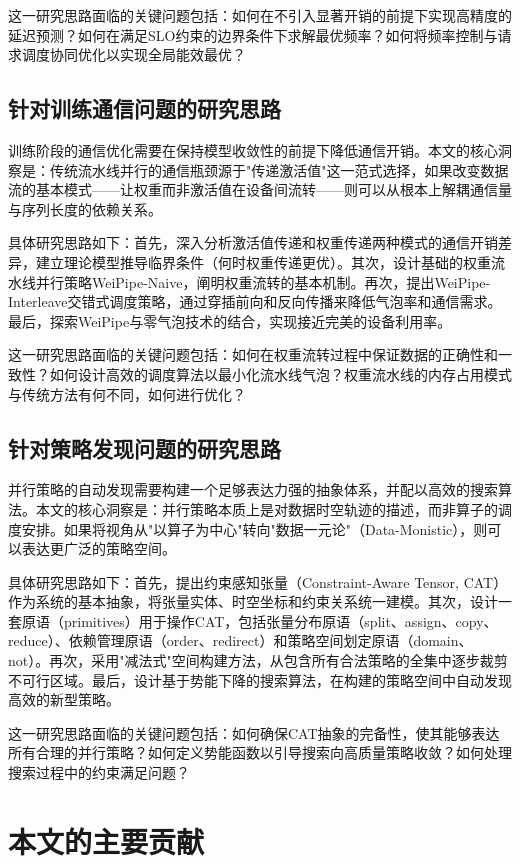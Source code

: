 这一研究思路面临的关键问题包括：如何在不引入显著开销的前提下实现高精度的延迟预测？如何在满足SLO约束的边界条件下求解最优频率？如何将频率控制与请求调度协同优化以实现全局能效最优？

\subsection{针对训练通信问题的研究思路}

训练阶段的通信优化需要在保持模型收敛性的前提下降低通信开销。本文的核心洞察是：传统流水线并行的通信瓶颈源于"传递激活值"这一范式选择，如果改变数据流的基本模式——让权重而非激活值在设备间流转——则可以从根本上解耦通信量与序列长度的依赖关系。

具体研究思路如下：首先，深入分析激活值传递和权重传递两种模式的通信开销差异，建立理论模型推导临界条件（何时权重传递更优）。其次，设计基础的权重流水线并行策略WeiPipe-Naive，阐明权重流转的基本机制。再次，提出WeiPipe-Interleave交错式调度策略，通过穿插前向和反向传播来降低气泡率和通信需求。最后，探索WeiPipe与零气泡技术的结合，实现接近完美的设备利用率。

这一研究思路面临的关键问题包括：如何在权重流转过程中保证数据的正确性和一致性？如何设计高效的调度算法以最小化流水线气泡？权重流水线的内存占用模式与传统方法有何不同，如何进行优化？

\subsection{针对策略发现问题的研究思路}

并行策略的自动发现需要构建一个足够表达力强的抽象体系，并配以高效的搜索算法。本文的核心洞察是：并行策略本质上是对数据时空轨迹的描述，而非算子的调度安排。如果将视角从"以算子为中心"转向"数据一元论"（Data-Monistic），则可以表达更广泛的策略空间。

具体研究思路如下：首先，提出约束感知张量（Constraint-Aware Tensor, CAT）作为系统的基本抽象，将张量实体、时空坐标和约束关系统一建模。其次，设计一套原语（primitives）用于操作CAT，包括张量分布原语（split、assign、copy、reduce）、依赖管理原语（order、redirect）和策略空间划定原语（domain、not）。再次，采用"减法式"空间构建方法，从包含所有合法策略的全集中逐步裁剪不可行区域。最后，设计基于势能下降的搜索算法，在构建的策略空间中自动发现高效的新型策略。

这一研究思路面临的关键问题包括：如何确保CAT抽象的完备性，使其能够表达所有合理的并行策略？如何定义势能函数以引导搜索向高质量策略收敛？如何处理搜索过程中的约束满足问题？

\section{本文的主要贡献}

